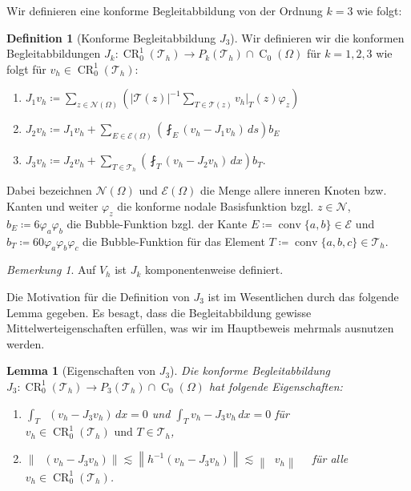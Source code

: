 \documentclass[a4paper]{scrartcl}
\newcommand{\crfem}{\operatorname{CR}_0^1}
\newcommand{\czero}{\operatorname{C}_0}
\newcommand{\J}[1]{J_{#1}}
\newcommand{\mesh}{\mathcal{T}_h}
\newcommand{\edges}{\mathcal{E}}
\newcommand{\nodes}{\mathcal{N}}
\newcommand{\dx}{\,dx}
\newcommand{\norm}[1]{\left\lVert#1\right\rVert}
\newcommand{\black}{\color{black}}
\newcommand{\blue}{\color{blue}}
\DeclareMathOperator{\nablah}{\nabla_{\textit{h}}}
\DeclareMathOperator{\conv}{conv}
\theoremstyle{plain}
\newtheorem{lemma}{Lemma}
\theoremstyle{definition}
\newtheorem{definition}{Definition}
\theoremstyle{remark}
\newtheorem*{remark*}{Bemerkung}
\begin{document}
\noindent Wir definieren eine konforme Begleitabbildung von der
Ordnung \(k = 3\) wie folgt: 

\black
\begin{definition}[Konforme Begleitabbildung \(J_3\)]\label{def:3}
  Wir definieren wir die konformen Begleitabbildungen \(J_k \colon
  \crfem(\mesh) \rightarrow P_k(\mesh)\cap\czero(\Omega)\) für
  \(k=1,2,3\) wie folgt für \(v_h \in \crfem(\mesh)\): 
  \begin{enumerate}[label=\textit{(\roman*)}]
  \item \(J_1 v_h \coloneqq \sum_{z \in
      \nodes(\Omega)}\left(\left\lvert \mathcal{T}(z)\right\rvert^{-1}
      \sum_{T\in \mathcal{T}(z)} v_h\vert_T(z) \varphi_z \right)\)
  \item \(J_2 v_h \coloneqq J_1 v_h + \sum_{E\in\edges(\Omega)} 
    \left(\fint_E (v_h - J_1 v_h) \,ds\right)b_E\)
  \item \(J_3 v_h \coloneqq J_2 v_h + \sum_{T\in\mesh}\left(\fint_T(v_h
      - J_2 v_h)\dx \right)b_T\). 
  \end{enumerate}
  Dabei bezeichnen \(\nodes(\Omega)\) und \(\edges(\Omega)\) die Menge
  allere inneren Knoten bzw. Kanten und weiter \(\varphi_z\) die
  konforme nodale Basisfunktion bzgl. \(z \in \nodes\), \(b_E
  \coloneqq 6\varphi_a\varphi_b\) die Bubble-Funktion bzgl. der Kante
  \(E \coloneqq \conv\{a,b\} \in \edges\) und \(b_T \coloneqq
  60\varphi_a\varphi_b\varphi_c\) die Bubble-Funktion für das Element
  \(T \coloneqq \conv\{a,b,c\} \in \mesh\).
\end{definition}

\begin{remark*}
  Auf \(V_h\) ist \(J_k\) komponentenweise definiert.
\end{remark*}

\blue
\noindent Die Motivation für die Definition von \(\J3\) ist im
Wesentlichen durch das folgende Lemma gegeben. Es besagt, dass die
Begleitabbildung gewisse Mittelwerteigenschaften erfüllen, was wir im
Hauptbeweis mehrmals ausnutzen werden. 

\black
\begin{lemma}[Eigenschaften von \(J_3\)]\label{lem:2}
  Die konforme Begleitabbildung \(\J3\colon \crfem(\mesh) \rightarrow
  P_3(\mesh)\cap\czero(\Omega)\) hat folgende Eigenschaften: 
  \begin{enumerate}[label=(\roman*)]
  \item \(\int_T \nablah(v_h - \J3 v_h)\dx = 0\) und \(\int_T
    v_h - \J3 v_h \dx = 0 \) für \(v_h \in
    \crfem(\mesh) \text{ und } T\in \mesh\),
  \item \(\norm{\nablah (v_h - \J3 v_h)} \lesssim \norm{h^{-1}(v_h -
      \J3 v_h)} \lesssim \norm{\nablah v_h} \quad\) für alle \(v_h \in
    \crfem(\mesh)\).
  \end{enumerate}
\end{lemma}
\end{document}
